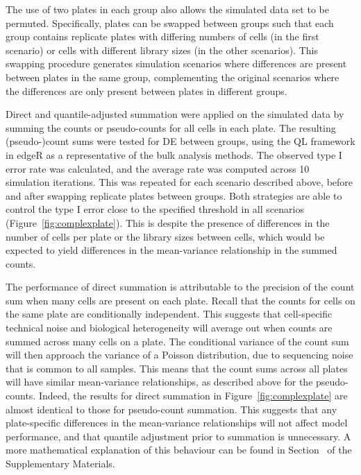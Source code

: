 \documentclass[oupdraft]{bio}
\begin{document}
The use of two plates in each group also allows the simulated data set to be permuted.
Specifically, plates can be swapped between groups such that each group contains replicate plates with differing numbers of cells (in the first scenario)
    or cells with different library sizes (in the other scenarios).
This swapping procedure generates simulation scenarios where differences are present between plates in the same group, 
    complementing the original scenarios where the differences are only present between plates in different groups.

Direct and quantile-adjusted summation were applied on the simulated data by summing the counts or pseudo-counts for all cells in each plate.
The resulting (pseudo-)count sums were tested for DE between groups, using the QL framework in edgeR as a representative of the bulk analysis methods.
The observed type I error rate was calculated, and the average rate was computed across 10 simulation iterations.
This was repeated for each scenario described above, before and after swapping replicate plates between groups.
Both strategies are able to control the type I error close to the specified threshold in all scenarios (Figure~\ref{fig:complexplate}).
This is despite the presence of differences in the number of cells per plate or the library sizes between cells,
    which would be expected to yield differences in the mean-variance relationship in the summed counts.

The performance of direct summation is attributable to the precision of the count sum when many cells are present on each plate.
Recall that the counts for cells on the same plate are conditionally independent. 
This suggests that cell-specific technical noise and biological heterogeneity will average out when counts are summed across many cells on a plate.
The conditional variance of the count sum will then approach the variance of a Poisson distribution, due to sequencing noise \citep{marioni2008rnaseq} that is common to all samples.
This means that the count sums across all plates will have similar mean-variance relationships, as described above for the pseudo-counts.
Indeed, the results for direct summation in Figure~\ref{fig:complexplate} are almost identical to those for pseudo-count summation.
This suggests that any plate-specific differences in the mean-variance relationships will not affect model performance, and that quantile adjustment prior to summation is unnecessary.
A more mathematical explanation of this behaviour can be found in Section~\suppmeanvar{} of the Supplementary Materials.
\end{document}
